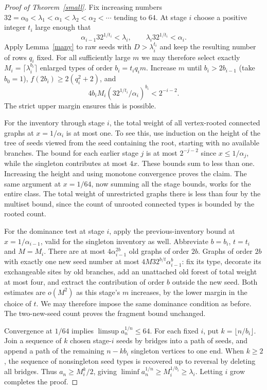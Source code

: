 \documentclass[11pt]{article}
\begin{document}
\begin{proof}[Proof of Theorem~\ref{small}]
Fix increasing numbers $32=\alpha_0<\lambda_1<\alpha_1<\lambda_2<\alpha_2<\cdots$ tending to $64$. At stage $i$ choose a positive integer $t_i$ large enough that
\[
 \alpha_{i-1}32^{1/t_i}<\lambda_i,\qquad
 \lambda_i32^{1/t_i}<\alpha_i.
\]
Apply Lemma~\ref{many} to raw seeds with $D>\lambda_i^{t_i}$ and keep the resulting number of rows $q_i$ fixed. For all sufficiently large $m$ we may therefore select exactly $M_i=\lceil\lambda_i^{b_i}\rceil$ enlarged types of order $b_i=t_iq_i m$. Increase $m$ until $b_i>2b_{i-1}$ (take $b_0=1$), $f(2b_i)\ge2(q_i^2+2)$, and
\[
 4b_i M_i (32^{1/t_i}/\alpha_i)^{b_i}<2^{-i-2}.
\]
The strict upper margin ensures this is possible.

For the inventory through stage $i$, the total weight of all vertex-rooted connected graphs at $x=1/\alpha_i$ is at most one. To see this, use induction on the height of the tree of seeds viewed from the seed containing the root, starting with no available branches. The bound for each earlier stage $j$ is at most $2^{-j-2}$ since $x\le1/\alpha_j$, while the singleton contributes at most $4x$. These bounds sum to less than one. Increasing the height and using monotone convergence proves the claim. The same argument at $x=1/64$, now summing all the stage bounds, works for the entire class. The total weight of unrestricted graphs there is less than four by the multiset bound, since the count of unrooted connected types is bounded by the rooted count.

For the dominance test at stage $i$, apply the previous-inventory bound at $x=1/\alpha_{i-1}$, valid for the singleton inventory as well. Abbreviate $b=b_i$, $t=t_i$ and $M=M_i$. There are at most $4\alpha_{i-1}^{2b}$ old graphs of order $2b$. Graphs of order $2b$ with exactly one new seed number at most $4M32^{b/t}\alpha_{i-1}^b$: fix its type, decorate its exchangeable sites by old branches, add an unattached old forest of total weight at most four, and extract the contribution of order $b$ outside the new seed. Both estimates are $o(M^2)$ as this stage's $m$ increases, by the lower margin in the choice of $t$. We may therefore impose the same dominance condition as before. The two-new-seed count proves the fragment bound unchanged.

Convergence at $1/64$ implies $\limsup a_n^{1/n}\le64$. For each fixed $i$, put $k=\lfloor n/b_i\rfloor$. Join a sequence of $k$ chosen stage-$i$ seeds by bridges into a path of seeds, and append a path of the remaining $n-kb_i$ singleton vertices to one end. When $k\ge2$, the sequence of nonsingleton seed types is recovered up to reversal by deleting all bridges. Thus $a_n\ge M_i^k/2$, giving $\liminf a_n^{1/n}\ge M_i^{1/b_i}\ge\lambda_i$. Letting $i$ grow completes the proof.
\end{proof}
\end{document}
